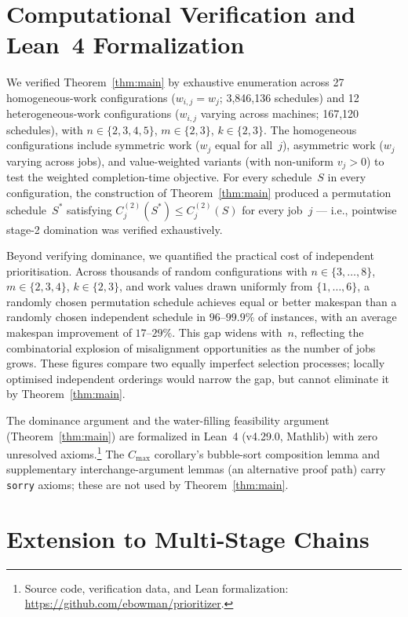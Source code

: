 \documentclass[11pt,titlepage]{article}
\begin{document}
\section{Computational Verification and Lean~4 Formalization}
\label{sec:computation}

We verified Theorem~\ref{thm:main} by exhaustive enumeration
across 27 homogeneous-work configurations ($w_{i,j} = w_j$;
3,846,136 schedules) and 12 heterogeneous-work configurations
($w_{i,j}$ varying across machines; 167,120 schedules), with
$n \in \{2,3,4,5\}$, $m \in \{2,3\}$, $k \in \{2,3\}$.
The homogeneous configurations include symmetric work
($w_j$ equal for all~$j$), asymmetric work ($w_j$ varying
across jobs), and value-weighted variants (with non-uniform
$v_j > 0$) to test the weighted completion-time objective.
For every schedule~$S$ in every configuration, the
construction of Theorem~\ref{thm:main} produced a permutation
schedule~$S^*$ satisfying $C^{(2)}_j(S^*) \leq C^{(2)}_j(S)$
for every job~$j$ --- i.e., pointwise stage-2 domination was
verified exhaustively.

Beyond verifying dominance, we quantified the practical cost of
independent prioritisation.  Across thousands of random
configurations with $n \in \{3, \ldots, 8\}$,
$m \in \{2, 3, 4\}$, $k \in \{2, 3\}$, and work values drawn
uniformly from $\{1, \ldots, 6\}$, a randomly chosen permutation
schedule achieves equal or better makespan than a randomly chosen
independent schedule in $96$--$99.9\%$ of instances, with an
average makespan improvement of $17$--$29\%$.  This gap widens
with~$n$, reflecting the combinatorial explosion of misalignment
opportunities as the number of jobs grows.  These figures compare
two equally imperfect selection processes; locally optimised
independent orderings would narrow the gap, but cannot eliminate
it by Theorem~\ref{thm:main}.

The dominance argument and the water-filling feasibility
argument (Theorem~\ref{thm:main}) are formalized in Lean~4
(v4.29.0, Mathlib) with zero unresolved
axioms.\footnote{Source code, verification data, and Lean
formalization: \url{https://github.com/ebowman/prioritizer}.}
The $C_{\max}$ corollary's bubble-sort composition lemma and
supplementary interchange-argument lemmas (an alternative proof
path) carry \texttt{sorry} axioms; these are not used by
Theorem~\ref{thm:main}.

\section{Extension to Multi-Stage Chains}
\label{sec:chain}
\end{document}
